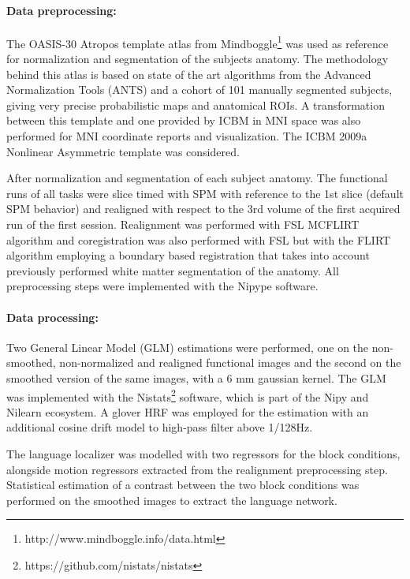 \paragraph{Data preprocessing:}
The OASIS-30 Atropos template atlas from Mindboggle\footnote{http://www.mindboggle.info/data.html} was used as reference for normalization and segmentation of the subjects anatomy. The methodology behind this atlas is based on state of the art algorithms from the Advanced Normalization Tools (ANTS) and a cohort of 101 manually segmented subjects, giving very precise probabilistic maps and anatomical ROIs\citep{klein2005mindboggle}. A transformation between this template and one provided by ICBM in MNI space was also performed for MNI coordinate reports and visualization. The ICBM 2009a Nonlinear Asymmetric template was considered\citep{collins1999animal+}.

After normalization and segmentation of each subject anatomy. The functional runs of all tasks were slice timed with SPM with reference to the 1st slice (default SPM behavior) and realigned with respect to the 3rd volume of the first acquired run of the first session.
Realignment was performed with FSL MCFLIRT algorithm and coregistration was also performed with FSL but with the FLIRT algorithm employing a boundary based registration that takes into account previously performed white matter segmentation of the anatomy\citep{greve2009accurate}.
All preprocessing steps were implemented with the Nipype software\citep{gorgolewski2011nipype}.

\paragraph{Data processing:}
Two General Linear Model (GLM) estimations were performed, one on the non-smoothed, non-normalized and realigned functional images and the second on the smoothed version of the same images, with a 6 mm gaussian kernel.
The GLM was implemented with the Nistats\footnote{https://github.com/nistats/nistats} software, which is part of the Nipy and Nilearn\citep{abraham2014machine} ecosystem.
A glover HRF was employed for the estimation with an additional cosine drift model to high-pass filter above 1/128Hz.

The language localizer was modelled with two regressors for the block conditions, alongside motion regressors extracted from the realignment preprocessing step.
Statistical estimation of a contrast between the two block conditions was performed on the smoothed images to extract the language network.

